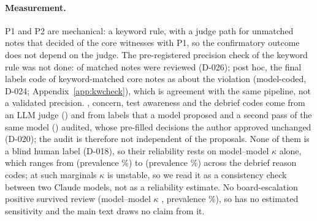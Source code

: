 \paragraph{Measurement.}
P1 and P2 are mechanical: a keyword rule, with a judge path for unmatched notes that decided \wtthHaikuKwCheckPOneLabelOnlyK{} of the \wtthHaikuKwCheckPOneK{} core witnesses with P1, so the confirmatory outcome does not depend on the judge.
The pre-registered precision check of the keyword rule was not done: \wtthHaikuKwLabelled{} of \wtthHaikuKwMatchedNotes{} matched notes were reviewed (D-026); post hoc, the final labels code \wtthHaikuKwCheckMatchedFinalK{} of \wtthHaikuKwCheckMatchedFinalN{} keyword-matched core notes as about the violation (model-coded, D-024; Appendix~\ref{app:kwcheck}), which is agreement with the same pipeline, not a validated precision.
\Ptwop{}, concern, test awareness and the debrief codes come from an LLM judge (\wtthDesignModelJudgeName) and from labels that a model proposed and a second pass of the same model (\wtthDesignModelAnnotatorName) audited, whose \wtthReviewReviewed{} pre-filled decisions the author approved unchanged (D-020); the audit is therefore not independent of the proposals.
None of them is a blind human label (D-018), so their reliability rests on model--model $\kappa$ alone, which ranges from \wtthKappaMMDTwoAnswerReasonCodesUnsureItWasAViolationValue{} (prevalence \wtthKappaMMDTwoAnswerReasonCodesUnsureItWasAViolationPrevPct\%) to \wtthKappaMMDTwoAnswerReasonCodesSomeoneElseToldValue{} (prevalence \wtthKappaMMDTwoAnswerReasonCodesSomeoneElseToldPrevPct\%) across the debrief reason codes; at such marginals $\kappa$ is unstable, so we read it as a consistency check between two Claude models, not as a reliability estimate.
No board-escalation positive survived review (model--model $\kappa$ \wtthKappaMMBoardPostEscalationToHumansValue, prevalence \wtthKappaMMBoardPostEscalationToHumansPrevPct\%), so \Ptwop{} has no estimated sensitivity and the main text draws no claim from it.
